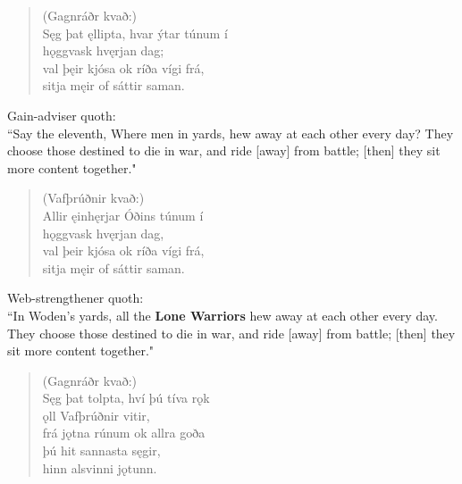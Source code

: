 \begin{verse}
(Gagnráðr kvað:) \\%
\bva Sęg þat ęllipta, \hld hvar ýtar túnum í \\%
\ind hǫggvask hvęrjan dag; \\%
val þęir kjósa \hld ok ríða vígi frá, \\%
\ind sitja męir of sáttir saman.\footnotemark[35]\\%
\end{verse}

\bvb Gain-adviser quoth: \\ “Say the eleventh, Where men in yards, hew away at each other every day? They choose those destined to die in war, and ride [away] from battle; [then] they sit more content together." \\

\begin{verse}
(Vafþrúðnir kvað:) \\%
\bva Allir ęinhęrjar \hld Óðins túnum í \\%
\ind hǫggvask hvęrjan dag, \\%
val þeir kjósa \hld ok ríða vígi frá, \\%
\ind sitja męir of sáttir saman.\\%
\end{verse}

\bvb Web-strengthener quoth: \\ “In Woden's yards, all the \textbf{Lone Warriors} hew away at each other every day. They choose those destined to die in war, and ride [away] from battle; [then] they sit more content together." \\

\begin{verse}
(Gagnráðr kvað:) \\%
\bva Sęg þat tolpta, \hld hví þú tíva rǫk \\%
\ind ǫll Vafþrúðnir vitir, \\%
frá jǫtna rúnum \hld ok allra goða \\%
\ind þú hit sannasta sęgir, \\%
\ind hinn alsvinni jǫtunn.\\%
\end{verse}

